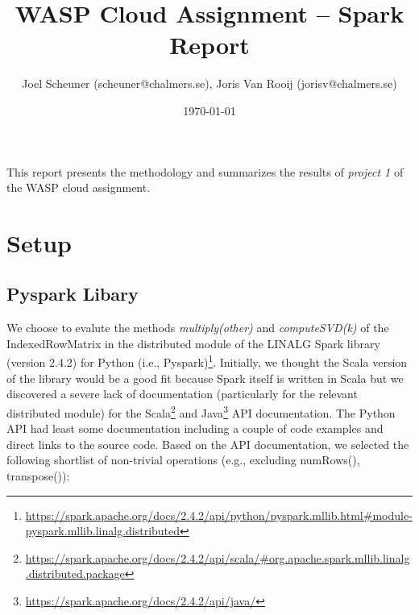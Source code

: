\documentclass{prog_report}
\newcommand{\footurl}[1]{\footnote{\url{#1}}}
\begin{document}
\title{WASP Cloud Assignment – Spark Report}

\author{Joel Scheuner (scheuner@chalmers.se), Joris Van Rooij (jorisv@chalmers.se)}

\date{\today}

\maketitle

%

This report presents the methodology and summarizes the results of \emph{project 1} of the WASP cloud assignment.

\section{Setup}

\subsection{Pyspark Libary}
We choose to evalute the methods \emph{multiply(other)} and \emph{computeSVD(k)} of the IndexedRowMatrix in the distributed module of the LINALG Spark library (version 2.4.2) for Python (i.e., Pyspark)\footurl{https://spark.apache.org/docs/2.4.2/api/python/pyspark.mllib.html\#module-pyspark.mllib.linalg.distributed}.
Initially, we thought the Scala version of the library would be a good fit because Spark itself is written in Scala but we discovered a severe lack of documentation (particularly for the relevant distributed module) for the Scala\footurl{https://spark.apache.org/docs/2.4.2/api/scala/\#org.apache.spark.mllib.linalg.distributed.package} and Java\footurl{https://spark.apache.org/docs/2.4.2/api/java/} API documentation.
The Python API had least some documentation including a couple of code examples and direct links to the source code.
Based on the API documentation, we selected the following shortlist of non-trivial operations (e.g., excluding numRows(), transpose()):
\end{document}
